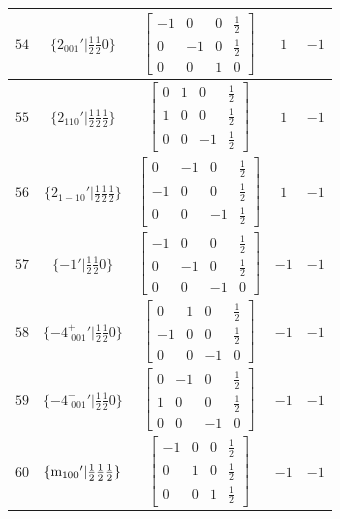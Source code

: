 \documentclass[fleqn,8pt]{jsarticle}
\begin{document}
\begin{longtable}{ccccc}
$ 54 $ & $ \{2{}_{001}{}'|\frac{1}{2} \frac{1}{2} 0\} $ & $ \begin{bmatrix} -1 & 0 & 0 & \frac{1}{2} \\ 0 & -1 & 0 & \frac{1}{2} \\ 0 & 0 & 1 & 0 \end{bmatrix} $ & $ 1 $ & $ -1 $ \\ \hline
$ 55 $ & $ \{2{}_{110}{}'|\frac{1}{2} \frac{1}{2} \frac{1}{2}\} $ & $ \begin{bmatrix} 0 & 1 & 0 & \frac{1}{2} \\ 1 & 0 & 0 & \frac{1}{2} \\ 0 & 0 & -1 & \frac{1}{2} \end{bmatrix} $ & $ 1 $ & $ -1 $ \\ \hline
$ 56 $ & $ \{2{}_{1-10}{}'|\frac{1}{2} \frac{1}{2} \frac{1}{2}\} $ & $ \begin{bmatrix} 0 & -1 & 0 & \frac{1}{2} \\ -1 & 0 & 0 & \frac{1}{2} \\ 0 & 0 & -1 & \frac{1}{2} \end{bmatrix} $ & $ 1 $ & $ -1 $ \\ \hline
$ 57 $ & $ \{-1{}'|\frac{1}{2} \frac{1}{2} 0\} $ & $ \begin{bmatrix} -1 & 0 & 0 & \frac{1}{2} \\ 0 & -1 & 0 & \frac{1}{2} \\ 0 & 0 & -1 & 0 \end{bmatrix} $ & $ -1 $ & $ -1 $ \\ \hline
$ 58 $ & $ \{-4^{+}_{\,\,001}{}'|\frac{1}{2} \frac{1}{2} 0\} $ & $ \begin{bmatrix} 0 & 1 & 0 & \frac{1}{2} \\ -1 & 0 & 0 & \frac{1}{2} \\ 0 & 0 & -1 & 0 \end{bmatrix} $ & $ -1 $ & $ -1 $ \\ \hline
$ 59 $ & $ \{-4^{-}_{\,\,001}{}'|\frac{1}{2} \frac{1}{2} 0\} $ & $ \begin{bmatrix} 0 & -1 & 0 & \frac{1}{2} \\ 1 & 0 & 0 & \frac{1}{2} \\ 0 & 0 & -1 & 0 \end{bmatrix} $ & $ -1 $ & $ -1 $ \\ \hline
$ 60 $ & $ \{{\rm m}_{100}{}'|\frac{1}{2} \frac{1}{2} \frac{1}{2}\} $ & $ \begin{bmatrix} -1 & 0 & 0 & \frac{1}{2} \\ 0 & 1 & 0 & \frac{1}{2} \\ 0 & 0 & 1 & \frac{1}{2} \end{bmatrix} $ & $ -1 $ & $ -1 $ \\ \hline

\end{longtable}
\end{document}

